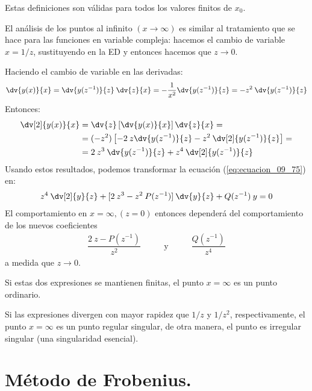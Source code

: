 Estas definiciones son válidas para todos los valores finitos de $x_{0}$. 
\par
El análisis de los puntos al infinito $(x \to \infty)$ es similar al tratamiento que se hace para las funciones en variable compleja: hacemos el cambio de variable $x = 1/z$, sustituyendo en la ED y entonces hacemos que $z \to 0$. 
\par
Haciendo el cambio de variable en las derivadas:
\begin{align}
\dv{y(x)}{x} = \dv{y(z^{-1})}{z} \: \dv{z}{x} = - \dfrac{1}{x^{2}} \dv{y(z^{-1})}{z} = -z^{2} \: \dv{y(z^{-1})}{z}
\label{eq:ecuacion_09_76}
\end{align}
Entonces:
\begin{align}
\begin{aligned}
\dv[2]{y(x)}{x} &= \dv{z} \left[ \dv{y(x)}{x} \right] \dv{z}{x} = \\
&= (-z^{2}) \left[ -2 \: z \dv{y(z^{-1})}{z} - z^{2} \: \dv[2]{y(z^{-1})}{z} \right] = \\
&= 2 \: z^{3} \: \dv{y(z^{-1})}{z} + z^{4} \: \dv[2]{y(z^{-1})}{z}
\end{aligned}
\label{eq:ecuacion_09_77}
\end{align}
Usando estos resultados, podemos transformar la ecuación (\ref{eq:ecuacion_09_75}) en:
\begin{align}
z^{4} \: \dv[2]{y}{z} + [ 2 \: z^{3} - z^{2} \: P(z^{-1})] \: \dv{y}{z} + Q(z^{-1}) \: y = 0
\label{eq:ecuacion_09_78}
\end{align}
El comportamiento en $x = \infty, (z = 0)$ entonces dependerá del comportamiento de los nuevos coeficientes
\begin{align*}
\dfrac{2 \: z - P(z^{-1})}{z^{2}} \hspace{1cm} \text{ y } \hspace{1cm} \dfrac{Q(z^{-1})}{z^{4}}
\end{align*}
a medida que $z \to 0$.
\par
Si estas dos expresiones se mantienen finitas, el punto $x = \infty$ es un punto ordinario.
\par
Si las expresiones divergen con mayor rapidez que $1/z$ y $1/z^{2}$, respectivamente, el punto $x = \infty$ es un punto regular singular, de otra manera, el punto es irregular singular (una singularidad esencial).

\section{Método de Frobenius.}
